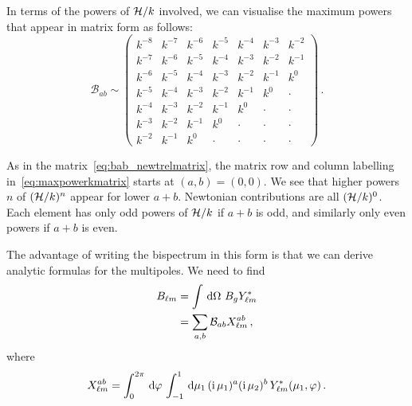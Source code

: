 In terms of the powers of $\mathcal{H}/k$ involved, we can visualise the maximum powers that appear in matrix form as follows:
\begin{equation}  \label{eq:maxpowerkmatrix}
\mathcal{B}_{ab}\sim \left( \begin {array}{ccccccc} {k}^{-8}&{k}^{-7}&{k}^{-6}&{k}^{-5}&{k
}^{-4}&{k}^{-3}&{k}^{-2}\\  
{k}^{-7}&{k}^{-6}&{k}^{-5
}&{k}^{-4}&{k}^{-3}&{k}^{-2}&{k}^{-1}\\  
{k}^{-6}&{k}
^{-5}&{k}^{-4}&{k}^{-3}&{k}^{-2}&{k}^{-1}&k^0\\  
{k}^{-
5}&{k}^{-4}&{k}^{-3}&{k}^{-2}&{k}^{-1}&k^0 & \cdot\\  
{k}^{-4
}&{k}^{-3}&{k}^{-2}&{k}^{-1}&k^0 &\cdot &\cdot \\  
{k}^{-3}&{k}^{-
2}&{k}^{-1}&k^0 & \cdot&\cdot &\cdot \\  
{k}^{-2}&{k}^{-1}&k^0 &\cdot & \cdot&\cdot & \cdot
\end {array} \right) \,.
\end{equation}

As in the matrix~\eqref{eq:bab_newtrelmatrix}, the matrix row and column labelling in~\eqref{eq:maxpowerkmatrix} starts at $(a,b) = (0,0)$. We see that higher powers $n$ of $(\mathcal{H}/k)^n$ appear for lower $a+b$. Newtonian contributions are all $({\cal H}/k)^0$. Each element has only odd powers of $\mathcal{H}/k$ if $a+b$ is odd, and similarly only even powers if $a+b$ is even.

The advantage of writing the bispectrum in this form is that we can derive analytic formulas for the multipoles. We need to find
\begin{align}
B_{\ell m} &= \int{\,\mathrm{d}}\Omega \,\,B_g Y^*_{\ell m} \nonumber \\
&= \sum_{a,b} \mathcal{B}_{ab} X_{\ell m}^{ab} \label{eq:xabexp} \,,
\end{align}
where 
\begin{equation} X_{\ell m}^{ab} = \int_0^{2\pi} \,\mathrm{d}\varphi\, \int_{-1}^1 \,\mathrm{d}\mu_1\, (\mathrm{i\,} \mu_1)^a (\mathrm{i\,} \mu_2)^b \,Y_{\ell m}^*(\mu_1,\varphi)\,.
\end{equation}

